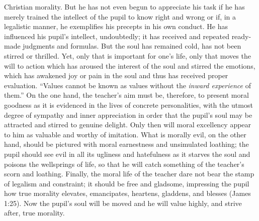 Christian morality. But he has not even begun to appreciate his task if he has merely trained the intellect of the pupil to know right and wrong or if, in a legalistic manner, he exemplifies his precepts in his own conduct. He has influenced his pupil’s intellect, undoubtedly; it has received and repeated ready-made judgments and formulas. But the soul has remained cold, has not been stirred or thrilled. Yet, only that is important for one’s life, only that moves the will to action which has aroused the interest of the soul and stirred the emotions, which has awakened joy or pain in the soul and thus has received proper evaluation. “Values cannot be known as values without the \emph{inward experience} of them.” On the one hand, the teacher’s aim must be, therefore, to present moral goodness as it is evidenced in the lives of concrete personalities, with the utmost degree of sympathy and inner appreciation in order that the pupil’s soul may be attracted and stirred to genuine delight. Only then will moral excellency appear to him as valuable and worthy of imitation. What is morally evil, on the other hand, should be pictured with moral earnestness and unsimulated loathing; the pupil should see evil in all its ugliness and hatefulness as it starves the soul and poisons the wellsprings of life, so that he will catch something of the teacher’s scorn and loathing. Finally, the moral life of the teacher dare not bear the stamp of legalism and constraint; it should be free and gladsome, impressing the pupil how true morality elevates, emancipates, heartens, gladdens, and blesses (James 1:25). Now the pupil’s soul will be moved and he will value highly, and strive after, true morality.

